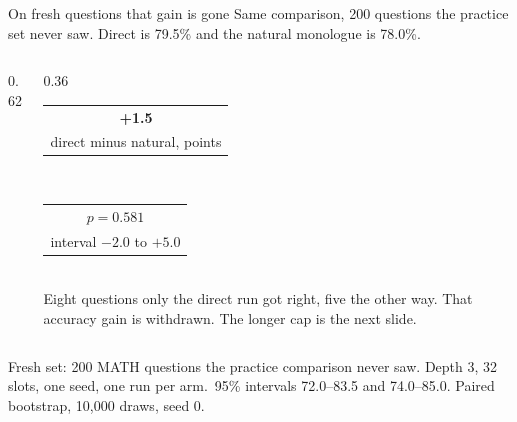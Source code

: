 \documentclass[aspectratio=169,11pt]{beamer}
\makeatletter
\newcommand{\src}[1]{\par\vfill\begin{minipage}{0.96\textwidth}\color{muted}\tiny #1\end{minipage}\vspace{-0.2em}}
\newcommand{\bignum}[3][ink]{%
  \begin{tabular}{@{}c@{}}
    {\color{#1}\fontsize{18}{20}\selectfont\bfseries #2}\\[3pt]
    \parbox{3.2cm}{\centering\scriptsize\color{muted} #3}
  \end{tabular}}
\newcommand{\Fresh}{Fresh set: 200 MATH questions the practice comparison never saw. Depth 3, 32 slots, one seed, one run per arm.}
\makeatother
\begin{document}
\begin{frame}{On fresh questions that gain is gone}
  Same comparison, 200 questions the practice set never saw.
  Direct is 79.5\% and the natural monologue is 78.0\%.
  \vspace{0.1em}
  \begin{columns}[c]
    \begin{column}{0.62\textwidth}
    \end{column}
    \begin{column}{0.36\textwidth}
      \bignum{+1.5}{direct minus natural, points}\\[0.7em]
      \bignum[warn]{$p = 0.581$}{interval $-2.0$ to $+5.0$}\\[0.55em]
      {\scriptsize\color{muted} Eight questions only the direct run got right, five the other way.
      That accuracy gain is withdrawn. The longer cap is the next slide.}
    \end{column}
  \end{columns}
  \src{\Fresh\ 95\% intervals 72.0--83.5 and 74.0--85.0. Paired bootstrap, 10{,}000 draws, seed 0.}
\end{frame}
\end{document}
